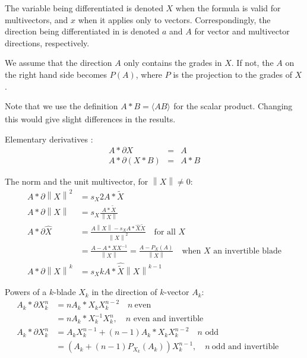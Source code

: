 \documentclass[a4paper,12pt]{article}
\newcommand{\grade}[2]{\ensuremath{\langle#2\rangle_{#1}}}
\newcommand{\reverse}[1]{\tilde{#1}} %
\providecommand{\norm}[1]{\left\lVert#1\right\rVert}
\providecommand{\normed}[1]{\hat{#1}}
\providecommand{\signX}[1]{\ensuremath{s_{#1}}}
\begin{document}
The variable being differentiated is denoted $X$ when the formula is valid for multivectors, and $x$ when it applies only to vectors. Correspondingly, the direction being differentiated in is denoted $a$ and $A$ for vector and multivector directions, respectively.

We assume that the direction $A$ only contains the grades in $X$. If not, the $A$ on the right hand side becomes $P(A)$, where $P$ is the projection to the grades of $X$.

Note that we use the definition $A * B = \grade{}{A B}$ for the scalar product. Changing this would give slight differences in the results.

Elementary derivatives \cite{HitzerCalculus}:
\begin{eqnarray}
A * \partial  X &=& A\\
A * \partial (X * B)  &=&  A * B
\end{eqnarray}

The norm and the unit multivector, for $\norm{X} \neq 0$:
\begin{align}
A * \partial \norm{X}^2 &= \signX{X}2 A * \reverse{X}\\
A * \partial \norm{X} &= \signX{X} \frac{A * \reverse{X}}{\norm{X}}\\
A * \partial \normed{X} &= \frac{A \norm{X} - \signX{X} A * \normed{X} \reverse{X}}{\norm{X}^2}\quad \textrm {for all $X$}\nonumber\\
&= \frac{A - A * X X^{-1}}{\norm{X}} = \frac{A- P_{X}(A)}{\norm{X}}\quad \textrm{when $X$ an invertible blade}\\
A * \partial \norm{X}^k &= \signX{X} k A * \normed{\reverse{X}} \norm{X}^{k-1}
\end{align}

Powers of a $k$-blade $X_k$ in the direction of $k$-vector $A_k$:
\begin{align}
A_k * \partial X_k^n &= n A_k *X_k X_k^{n - 2} \quad n\ \mathrm{even}&&\\
&= n A_k * X_k^{-1} X_k^{n},\quad n \textrm{ even and invertible}&&\\
A_k * \partial X_k^n &= A_k X_k^{n-1} + (n-1) A_k*X_k X_k^{n-2}
\quad n \textrm{ odd}&&\nonumber\\
&= \left(A_k + (n-1) P_{X_k}(A_k)\right) X_k^{n-1},\quad n\ \textrm{odd and invertible}&&
\end{align}
\end{document}
